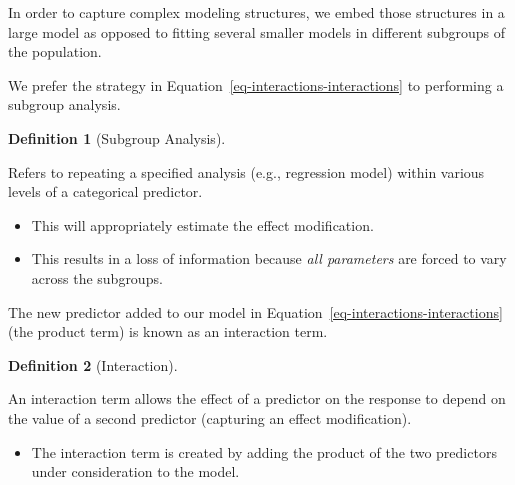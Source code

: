 \documentclass[
  letterpaper,
  DIV=11,
  numbers=noendperiod]{scrreprt}
\providecommand{\tightlist}{%
  \setlength{\itemsep}{0pt}\setlength{\parskip}{0pt}}\usepackage{longtable,booktabs,array}
\theoremstyle{definition}
\newtheorem{definition}{Definition}[chapter]
\theoremstyle{definition}
\theoremstyle{remark}
\begin{document}
\begin{tcolorbox}[enhanced jigsaw, left=2mm, toprule=.15mm, arc=.35mm, breakable, opacitybacktitle=0.6, opacityback=0, rightrule=.15mm, colbacktitle=quarto-callout-tip-color!10!white, coltitle=black, leftrule=.75mm, toptitle=1mm, colframe=quarto-callout-tip-color-frame, titlerule=0mm, title=\textcolor{quarto-callout-tip-color}{\faLightbulb}\hspace{0.5em}{Big Idea}, bottomrule=.15mm, colback=white, bottomtitle=1mm]

In order to capture complex modeling structures, we embed those
structures in a large model as opposed to fitting several smaller models
in different subgroups of the population.

\end{tcolorbox}

We prefer the strategy in Equation~\ref{eq-interactions-interactions} to
performing a subgroup analysis.

\begin{definition}[Subgroup
Analysis]\protect\hypertarget{def-subgroup-analysis}{}\label{def-subgroup-analysis}

Refers to repeating a specified analysis (e.g., regression model) within
various levels of a categorical predictor.

\begin{itemize}
\tightlist
\item
  This will appropriately estimate the effect modification.
\item
  This results in a loss of information because \emph{all parameters}
  are forced to vary across the subgroups.
\end{itemize}

\end{definition}

The new predictor added to our model in
Equation~\ref{eq-interactions-interactions} (the product term) is known
as an interaction term.

\begin{definition}[Interaction]\protect\hypertarget{def-interaction}{}\label{def-interaction}

An interaction term allows the effect of a predictor on the response to
depend on the value of a second predictor (capturing an effect
modification).

\begin{itemize}
\tightlist
\item
  The interaction term is created by adding the product of the two
  predictors under consideration to the model.
\end{itemize}

\end{definition}
\end{document}
